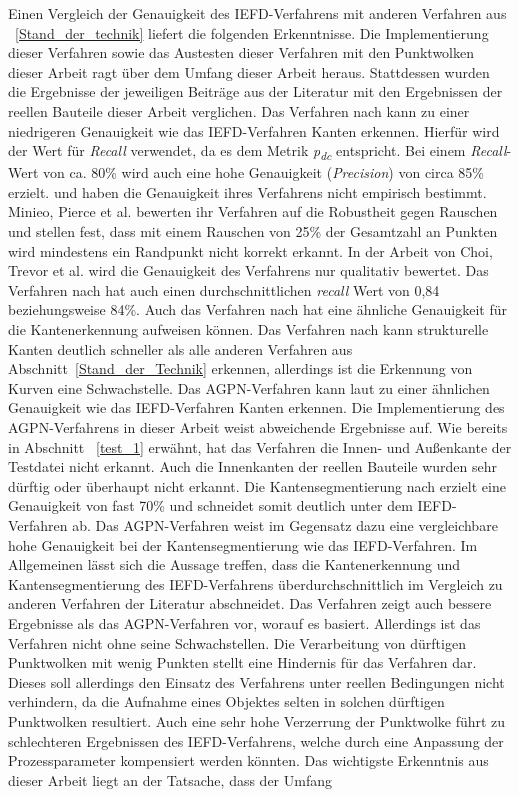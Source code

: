 Einen Vergleich der Genauigkeit des IEFD-Verfahrens mit anderen Verfahren aus ~\ref{Stand_der_technik} liefert die folgenden Erkenntnisse. Die Implementierung dieser Verfahren sowie das Austesten dieser Verfahren mit den Punktwolken dieser Arbeit ragt über dem Umfang dieser Arbeit heraus. Stattdessen wurden die Ergebnisse der jeweiligen Beiträge aus der Literatur mit den Ergebnissen der reellen Bauteile dieser Arbeit verglichen. Das Verfahren nach \textcite[7353]{ahmed_edge_2018} kann zu einer niedrigeren Genauigkeit wie das IEFD-Verfahren Kanten erkennen. Hierfür wird der Wert für \textit{Recall} verwendet, da es dem Metrik \textit{p\textsubscript{dc}} entspricht. Bei einem \textit{Recall}-Wert von ca. 80\% wird auch eine hohe Genauigkeit (\textit{Precision}) von circa 85\% erzielt. \textcite[88]{mineo_novel_2019} und \textcite{choi_rgb-d_2013} haben die Genauigkeit ihres Verfahrens nicht empirisch bestimmt. Minieo, Pierce et al. bewerten ihr Verfahren auf die Robustheit gegen Rauschen und stellen fest, dass mit einem Rauschen von 25\% der Gesamtzahl an Punkten wird mindestens ein Randpunkt nicht korrekt erkannt. In der Arbeit von Choi, Trevor et al. wird die Genauigkeit des Verfahrens nur qualitativ bewertet. Das Verfahren nach \textcite[11]{bazazian_edc-net_2021} hat auch einen durchschnittlichen \textit{recall} Wert von 0,84 beziehungsweise 84\%. Auch das Verfahren nach \textcite[9]{himeur_pcednet_2021} hat eine ähnliche Genauigkeit für die Kantenerkennung aufweisen können. Das Verfahren nach \textcite{lu_fast_2019} kann strukturelle Kanten deutlich schneller als alle anderen Verfahren aus Abschnitt~\ref{Stand_der_Technik} erkennen, allerdings ist die Erkennung von Kurven eine Schwachstelle. Das AGPN-Verfahren kann laut \textcite{ni_edge_2016} zu einer ähnlichen Genauigkeit wie das IEFD-Verfahren Kanten erkennen. Die Implementierung des AGPN-Verfahrens in dieser Arbeit weist abweichende Ergebnisse auf. Wie bereits in Abschnitt ~\ref{test_1} erwähnt, hat das Verfahren die Innen- und Außenkante der Testdatei nicht erkannt. Auch die Innenkanten der reellen Bauteile wurden sehr dürftig oder überhaupt nicht erkannt. Die Kantensegmentierung nach \textcite[234]{hu_jsenet_2020} erzielt eine Genauigkeit von fast 70\% und schneidet somit deutlich unter dem IEFD-Verfahren ab. Das AGPN-Verfahren weist im Gegensatz dazu eine vergleichbare hohe Genauigkeit bei der Kantensegmentierung wie das IEFD-Verfahren. Im Allgemeinen lässt sich die Aussage treffen, dass die Kantenerkennung und Kantensegmentierung des IEFD-Verfahrens überdurchschnittlich im Vergleich zu anderen Verfahren der Literatur abschneidet. Das Verfahren zeigt auch bessere Ergebnisse als das AGPN-Verfahren vor, worauf es basiert. Allerdings ist das Verfahren nicht ohne seine Schwachstellen. Die Verarbeitung von dürftigen Punktwolken mit wenig Punkten stellt eine Hindernis für das Verfahren dar. Dieses soll allerdings den Einsatz des Verfahrens unter reellen Bedingungen nicht verhindern, da die Aufnahme eines Objektes selten in solchen dürftigen Punktwolken resultiert. Auch eine sehr hohe Verzerrung der Punktwolke führt zu schlechteren Ergebnissen des IEFD-Verfahrens, welche durch eine Anpassung der Prozessparameter kompensiert werden könnten. Das wichtigste Erkenntnis aus dieser Arbeit liegt an der Tatsache, dass der Umfang 